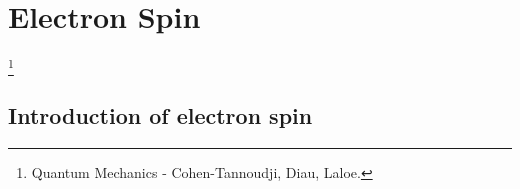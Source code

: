 \chapter{Electron Spin}\footnote{Quantum Mechanics - Cohen-Tannoudji, Diau, Laloe.}
\section{Introduction of electron spin}
